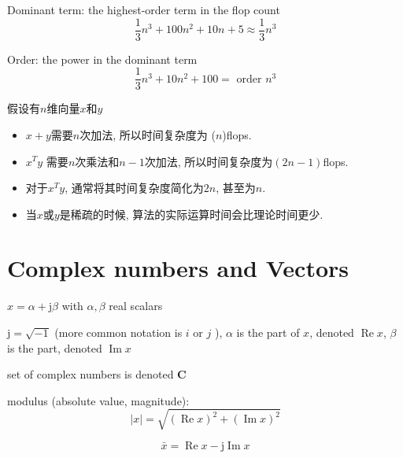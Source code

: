 \begin{definition}
    Dominant term: the highest-order term in the flop count
$$
\frac{1}{3} n^{3}+100 n^{2}+10 n+5 \approx \frac{1}{3} n^{3}
$$

Order: the power in the dominant term
$$
\frac{1}{3} n^{3}+10 n^{2}+100=\text { order } n^{3}
$$
\end{definition}





\begin{corollary}
    假设有$n$维向量$x$和$y$

    \begin{itemize}
        \item $x+y$需要$n$次加法, 所以时间复杂度为 ($n$)flops. 
        \item $x^T y$ 需要$n$次乘法和$n - 1$次加法, 所以时间复杂度为$(2n - 1)$flops. 
        \item 对于$x^T y$, 通常将其时间复杂度简化为$2n$, 甚至为$n$. 
        \item 当$x$或$y$是稀疏的时候, 算法的实际运算时间会比理论时间更少. 
    \end{itemize}
\end{corollary}


\section{Complex numbers and Vectors}

\begin{definition}
    $ x=\alpha+\mathrm{j} \beta $ with $ \alpha, \beta $ real scalars

    $ \mathrm{j}=\sqrt{-1} $ (more common notation is $ i $ or $ j $ ), $ \alpha $ is the  part of $ x $, denoted $ \operatorname{Re} x $, $ \beta $ is the  part, denoted $ \operatorname{Im} x $
\end{definition}

\begin{definition}
    set of complex numbers is denoted $ \mathbf{C} $
\end{definition}

\begin{definition}[Modulus]
    modulus (absolute value, magnitude): $$ |x|=\sqrt{(\operatorname{Re} x)^{2}+(\operatorname{Im} x)^{2}} $$
\end{definition}

\begin{definition}[conjugate]
    $$ \bar{x}=\operatorname{Re} x-\mathrm{j} \operatorname{Im} x $$
\end{definition}

